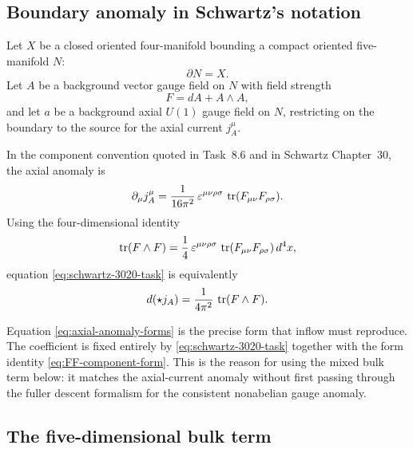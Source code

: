 \subsection{Boundary anomaly in Schwartz's notation}

\begin{assumption}\label{ass:hep-inflow}
Let $X$ be a closed oriented four-manifold bounding a compact oriented five-manifold $N$:
\begin{equation*}
\partial N = X.
\end{equation*}
Let $A$ be a background vector gauge field on $N$ with field strength
\begin{equation*}
F=dA+A\wedge A,
\end{equation*}
and let $a$ be a background axial $U(1)$ gauge field on $N$, restricting on the boundary to the source for the axial current $j_A^\mu$.
\end{assumption}

\noindent In the component convention quoted in Task~8.6 and in Schwartz Chapter~30, the axial anomaly is
\begin{equation}\label{eq:schwartz-3020-task}
\partial_\mu j_A^\mu
=
\frac{1}{16\pi^2}\,
\varepsilon^{\mu\nu\rho\sigma}\,
\operatorname{tr}(F_{\mu\nu}F_{\rho\sigma}).
\end{equation}
Using the four-dimensional identity
\begin{equation}\label{eq:FF-component-form}
\operatorname{tr}(F\wedge F)
=
\frac{1}{4}\,
\varepsilon^{\mu\nu\rho\sigma}\,
\operatorname{tr}(F_{\mu\nu}F_{\rho\sigma})\,d^4x,
\end{equation}
equation \eqref{eq:schwartz-3020-task} is equivalently
\begin{equation}\label{eq:axial-anomaly-forms}
d(\star j_A)=\frac{1}{4\pi^2}\,\operatorname{tr}(F\wedge F).
\end{equation}

\begin{remark}\label{rem:schwartz-match}
Equation \eqref{eq:axial-anomaly-forms} is the precise form that inflow must reproduce. The coefficient is fixed entirely by \eqref{eq:schwartz-3020-task} together with the form identity \eqref{eq:FF-component-form}. This is the reason for using the mixed bulk term below: it matches the axial-current anomaly without first passing through the fuller descent formalism for the consistent nonabelian gauge anomaly.
\end{remark}

\subsection{The five-dimensional bulk term}


